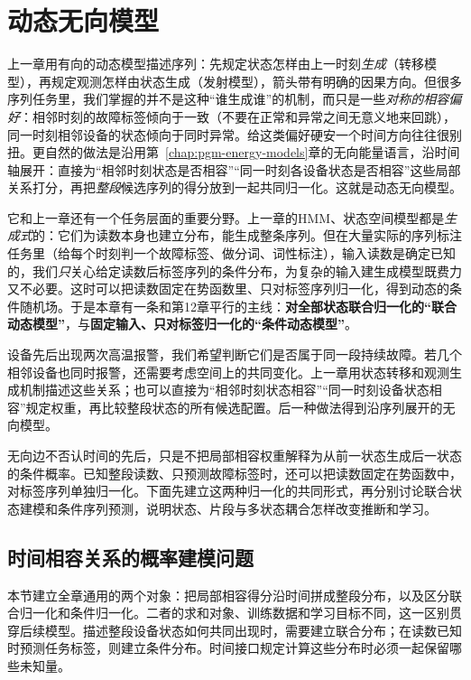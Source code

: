 \chapter{动态无向模型}
\label{chap:pgm-dynamic-undirected}

上一章用有向的动态模型描述序列：先规定状态怎样由上一时刻\emph{生成}（转移模型），再规定观测怎样由状态生成（发射模型），箭头带有明确的因果方向。但很多序列任务里，我们掌握的并不是这种“谁生成谁”的机制，而只是一些\emph{对称的相容偏好}：相邻时刻的故障标签倾向于一致（不要在正常和异常之间无意义地来回跳），同一时刻相邻设备的状态倾向于同时异常。给这类偏好硬安一个时间方向往往很别扭。更自然的做法是沿用第~\ref{chap:pgm-energy-models}章的无向能量语言，沿时间轴展开：直接为“相邻时刻状态是否相容”“同一时刻各设备状态是否相容”这些局部关系打分，再把\emph{整段}候选序列的得分放到一起共同归一化。这就是动态无向模型。

它和上一章还有一个任务层面的重要分野。上一章的HMM、状态空间模型都是\emph{生成式}的：它们为读数本身也建立分布，能生成整条序列。但在大量实际的序列标注任务里（给每个时刻判一个故障标签、做分词、词性标注），输入读数是确定已知的，我们\emph{只}关心给定读数后标签序列的条件分布，为复杂的输入建生成模型既费力又不必要。这时可以把读数固定在势函数里、只对标签序列归一化，得到动态的条件随机场。于是本章有一条和第12章平行的主线：\textbf{对全部状态联合归一化的“联合动态模型”}，与\textbf{固定输入、只对标签归一化的“条件动态模型”}。

设备先后出现两次高温报警，我们希望判断它们是否属于同一段持续故障。若几个相邻设备也同时报警，还需要考虑空间上的共同变化。上一章用状态转移和观测生成机制描述这些关系；也可以直接为“相邻时刻状态相容”“同一时刻设备状态相容”规定权重，再比较整段状态的所有候选配置。后一种做法得到沿序列展开的无向模型。

无向边不否认时间的先后，只是不把局部相容权重解释为从前一状态生成后一状态的条件概率。已知整段读数、只预测故障标签时，还可以把读数固定在势函数中，对标签序列单独归一化。下面先建立这两种归一化的共同形式，再分别讨论联合状态建模和条件序列预测，说明状态、片段与多状态耦合怎样改变推断和学习。

\section{时间相容关系的概率建模问题}
\label{sec:pgm-dynamic-undirected-common}

本节建立全章通用的两个对象：把局部相容得分沿时间拼成整段分布，以及区分联合归一化和条件归一化。二者的求和对象、训练数据和学习目标不同，这一区别贯穿后续模型。描述整段设备状态如何共同出现时，需要建立联合分布；在读数已知时预测任务标签，则建立条件分布。时间接口规定计算这些分布时必须一起保留哪些未知量。

